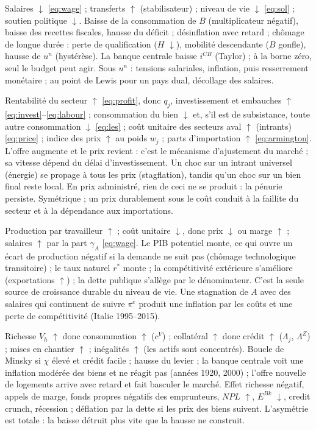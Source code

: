 \documentclass[11pt,a4paper]{article}
\newcommand{\up}{$\uparrow$}
\newcommand{\dn}{$\downarrow$}
\begin{document}
\direct Salaires \dn{} \eqref{eq:wage} ; transferts \up{} (stabilisateur) ; niveau de vie \dn{} \eqref{eq:sol} ; soutien politique \dn.
\second Baisse de la consommation de $B$ (multiplicateur négatif), baisse des recettes fiscales, hausse du déficit ; désinflation avec retard ; chômage de longue durée : perte de qualification ($H$ \dn), mobilité descendante ($B$ gonfle), hausse de $u^n$ (hystérèse). La banque centrale baisse $i^{CB}$ (Taylor) ; à la borne zéro, seul le budget peut agir.
\baisse Sous $u^n$ : tensions salariales, inflation, puis resserrement monétaire ; au point de Lewis pour un pays dual, décollage des salaires.

\direct Rentabilité du secteur \up{} \eqref{eq:profit}, donc $q_j$, investissement et embauches \up{} \eqref{eq:invest}--\eqref{eq:labour} ; consommation du bien \dn{} et, s'il est de subsistance, toute autre consommation \dn{} \eqref{eq:les} ; coût unitaire des secteurs aval \up{} (intrants) \eqref{eq:price} ; indice des prix \up{} au poids $w_j$ ; parts d'importation \up{} \eqref{eq:armington}.
\second L'offre augmente et le prix revient : c'est le mécanisme d'ajustement du marché ; sa vitesse dépend du délai d'investissement. Un choc sur un intrant universel (énergie) se propage à tous les prix (stagflation), tandis qu'un choc sur un bien final reste local. En prix administré, rien de ceci ne se produit : la pénurie persiste.
\baisse Symétrique ; un prix durablement sous le coût conduit à la faillite du secteur et à la dépendance aux importations.

\direct Production par travailleur \up{} ; coût unitaire \dn{}, donc prix \dn{} ou marge \up{} ; salaires \up{} par la part $\gamma_A$ \eqref{eq:wage}.
\second Le PIB potentiel monte, ce qui ouvre un écart de production négatif si la demande ne suit pas (chômage technologique transitoire) ; le taux naturel $r^\ast$ monte ; la compétitivité extérieure s'améliore (exportations \up) ; la dette publique s'allège par le dénominateur. C'est la seule source de croissance durable du niveau de vie.
\baisse Une stagnation de $A$ avec des salaires qui continuent de suivre $\pi^e$ produit une inflation par les coûts et une perte de compétitivité (Italie 1995--2015).

\direct Richesse $V_h$ \up{} donc consommation \up{} ($c^V$) ; collatéral \up{} donc crédit \up{} ($\Lambda_j$, $\Lambda^Z$) ; mises en chantier \up{} ; inégalités \up{} (les actifs sont concentrés).
\second Boucle de Minsky si $\chi$ élevé et crédit facile ; hausse du levier ; la banque centrale voit une inflation modérée des biens et ne réagit pas (années 1920, 2000) ; l'offre nouvelle de logements arrive avec retard et fait basculer le marché.
\baisse Effet richesse négatif, appels de marge, fonds propres négatifs des emprunteurs, $NPL$ \up, $E^{Bk}$ \dn, credit crunch, récession ; déflation par la dette si les prix des biens suivent. L'asymétrie est totale : la baisse détruit plus vite que la hausse ne construit.
\end{document}
